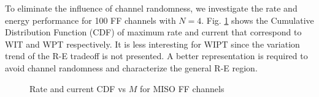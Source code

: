 To eliminate the influence of channel randomness, we investigate the rate and energy performance for 100 FF channels with $N = 4$. Fig. \ref{fig:miso-cdf} shows the Cumulative Distribution Function (CDF) of maximum rate and current that correspond to WIT and WPT respectively. It is less interesting for WIPT since the variation trend of the R-E tradeoff is not presented. A better representation is required to avoid channel randomness and characterize the general R-E region.

\begin{figure}[ht]
  \centering
  \caption{Rate and current CDF vs $M$ for MISO FF channels}
  \label{fig:miso-cdf}
\end{figure} 